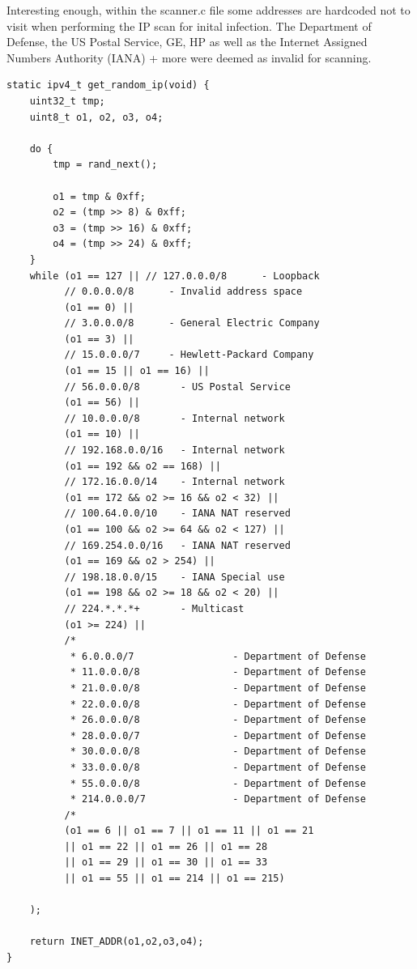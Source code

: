 \documentclass[12pt, letterpaper]{article}
\begin{document}
\begin{sloppypar}
\begin{flushleft}
Interesting enough, within the scanner.c file some addresses are hardcoded not to visit 
when performing the IP scan for inital infection. The Department of Defense, the US Postal
Service, GE, HP as well as the Internet Assigned Numbers Authority (IANA) + more were 
deemed as invalid for scanning.

\begin{lstlisting}
static ipv4_t get_random_ip(void) {
    uint32_t tmp;
    uint8_t o1, o2, o3, o4;

    do {
        tmp = rand_next();

        o1 = tmp & 0xff;
        o2 = (tmp >> 8) & 0xff;
        o3 = (tmp >> 16) & 0xff;
        o4 = (tmp >> 24) & 0xff;
    }
    while (o1 == 127 || // 127.0.0.0/8      - Loopback
          // 0.0.0.0/8		- Invalid address space
          (o1 == 0) || 
          // 3.0.0.0/8		- General Electric Company
          (o1 == 3) || 
          // 15.0.0.0/7		- Hewlett-Packard Company
          (o1 == 15 || o1 == 16) || 
          // 56.0.0.0/8       - US Postal Service
          (o1 == 56) || 
          // 10.0.0.0/8       - Internal network
          (o1 == 10) || 
          // 192.168.0.0/16   - Internal network
          (o1 == 192 && o2 == 168) ||
          // 172.16.0.0/14    - Internal network
          (o1 == 172 && o2 >= 16 && o2 < 32) ||
          // 100.64.0.0/10    - IANA NAT reserved
          (o1 == 100 && o2 >= 64 && o2 < 127) ||
          // 169.254.0.0/16   - IANA NAT reserved
          (o1 == 169 && o2 > 254) ||
          // 198.18.0.0/15    - IANA Special use
          (o1 == 198 && o2 >= 18 && o2 < 20) ||
          // 224.*.*.*+       - Multicast
          (o1 >= 224) ||
		  /*
		   * 6.0.0.0/7                 - Department of Defense 
		   * 11.0.0.0/8                - Department of Defense
		   * 21.0.0.0/8                - Department of Defense
		   * 22.0.0.0/8                - Department of Defense
		   * 26.0.0.0/8                - Department of Defense
		   * 28.0.0.0/7                - Department of Defense
		   * 30.0.0.0/8                - Department of Defense
		   * 33.0.0.0/8                - Department of Defense
		   * 55.0.0.0/8                - Department of Defense
		   * 214.0.0.0/7               - Department of Defense
		  /*          
          (o1 == 6 || o1 == 7 || o1 == 11 || o1 == 21 
          || o1 == 22 || o1 == 26 || o1 == 28 
          || o1 == 29 || o1 == 30 || o1 == 33 
          || o1 == 55 || o1 == 214 || o1 == 215) 
          
    );

    return INET_ADDR(o1,o2,o3,o4);
}


\end{lstlisting}
\end{flushleft}
\end{sloppypar}
\end{document}
